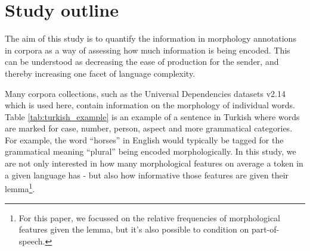 \documentclass[a4paper]{article}
\begin{document}


\FloatBarrier
\section{Study outline}
The aim of this study is to quantify the information in morphology annotations in corpora as a way of assessing how much information is being encoded. This can be understood as decreasing the ease of production for the sender, and thereby increasing one facet of language complexity.

Many corpora collections, such as the Universal Dependencies datasets v2.14 \citep{UD_2.14} which is used here, contain information on the morphology of individual words. Table \ref{tab:turkish_example} is an example of a sentence in Turkish where words are marked for case, number, person, aspect and more grammatical categories.
For example, the word ``horses'' in English would typically be tagged for the grammatical meaning ``plural'' being encoded morphologically.
In this study, we are not only interested in how many morphological features on average a token in a given language has - but also how informative those features are given their lemma\footnote{For this paper, we focussed on the relative frequencies of morphological features given the lemma, but it's also possible to condition on part-of-speech.}. 
\end{document}
